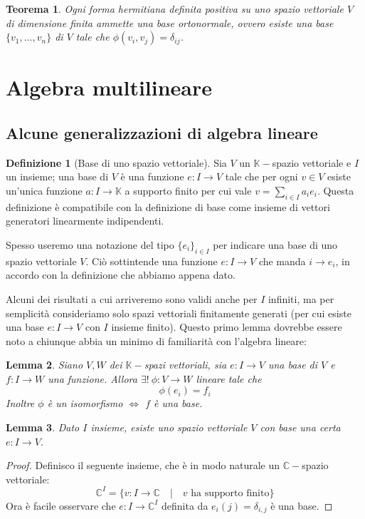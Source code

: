 \documentclass[11pt]{article}
\theoremstyle{plain}
\newtheorem{thm}{Teorema}[section]
\newtheorem{lemma}[thm]{Lemma}
\theoremstyle{definition}
\newtheorem{defn}{Definizione}[section]
\theoremstyle{remark}
\newcommand{\C}{\mathbb{C}}
\newcommand{\K}{\mathbb{K}}
\begin{document}
\begin{thm}
	Ogni forma hermitiana definita positiva su uno spazio vettoriale $V$ di dimensione finita ammette una \textit{base ortonormale}, ovvero esiste una base $\{v_1,\ldots,v_n\}$ di $V$ tale che $\phi(v_i,v_j)=\delta_{ij}$.
\end{thm}




\newpage
\section{Algebra multilineare}
\subsection{Alcune generalizzazioni di algebra lineare}

\begin{defn}[Base di uno spazio vettoriale]
Sia $V$ un $\K-$spazio vettoriale e $I$ un insieme; una base di $V$ è una funzione $e: I \to V$ tale che
per ogni $v \in V$ esiste un'unica funzione $a: I \to \K$ a supporto finito per cui vale $v=\sum_{i\in I}a_i e_i$.
Questa definizione è compatibile con la definizione di base come insieme di vettori generatori linearmente indipendenti.

Spesso useremo una notazione del tipo $\{e_i\}_{i\in I}$ per indicare una base di uno spazio vettoriale $V$. Ciò sottintende
una funzione $e:I\to V$ che manda $i\to e_i$, in accordo con la definizione che abbiamo appena dato.
\end{defn}

Alcuni dei risultati a cui arriveremo sono validi anche per $I$ infiniti, ma per semplicità consideriamo solo
spazi vettoriali finitamente generati (per cui esiste una base $e: I \to V$ con $I$ insieme finito).
Questo primo lemma dovrebbe essere noto a chiunque abbia un minimo di familiarità con l'algebra lineare:
\begin{lemma}
Siano $V,W$ dei $\K-$spazi vettoriali, sia $e:I\to V$ una base di $V$ e $f: I \to W$ una funzione. Allora $\exists!\  \phi: V \to W$ lineare tale che
\[\phi(e_i) = f_i \]
Inoltre $\phi$ è un isomorfismo $\Leftrightarrow$ $f$ è una base.
\end{lemma}

\begin{lemma}
Dato $I$ insieme, esiste uno spazio vettoriale $V$ con base una certa $e:I\to V$.
\end{lemma}
\begin{proof}
Definisco il seguente insieme, che è in modo naturale un $\C-$spazio vettoriale:
\[ \C^I = \{ v:I\to\C \quad|\quad v \text{ ha supporto finito}\}\]
Ora è facile osservare che $e:I\to\C^I$ definita da $e_i(j) = \delta_{i,j}$ è una base.
\end{proof}
\end{document}
